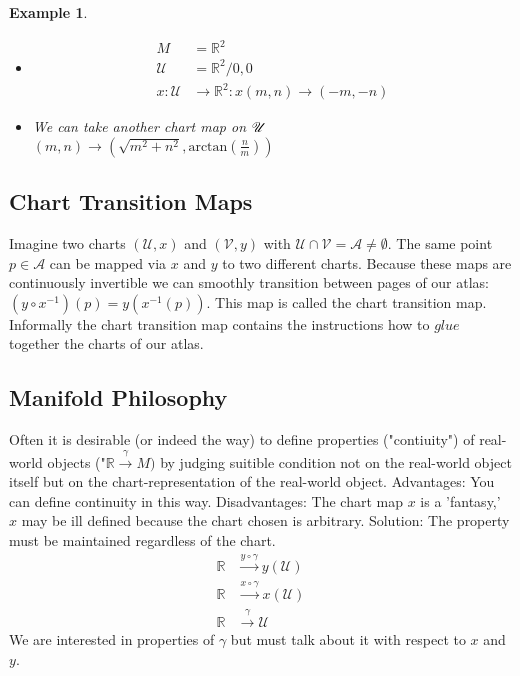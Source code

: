 \documentclass[10pt, oneside]{article}
\newcommand{\R}{\mathbb{R}}
\newtheorem{example}{Example}
\begin{document}
        \begin{example}
           \begin{itemize}
              \item \begin{align*}
                 M &= \R^2 \\
                 \mathcal{U} &= \R^2 \slash {0,0} \\
                 x: \mathcal{U} &\to \R^2 : x(m,n) \to (-m,-n)
              \end{align*}
              \item We can take another chart map on $\mathcal{U}\\$
           $(m,n) \to (\sqrt{m^2+n^2}, \text{arctan}(\frac{n}{m}))$
           \end{itemize}
        \end{example}
     \subsection{Chart Transition Maps}
        Imagine two charts $(\mathcal{U},x)$ and $(\mathcal{V},y)$ with $\mathcal{U} \cap \mathcal{V} = \mathcal{A} \neq \emptyset$. The same point $p \in \mathcal{A}$ can be mapped via $x$ and $y$ to two different charts.
        Because these maps are continuously invertible we can smoothly transition between pages of our atlas: $(y \circ x^{-1})(p) = y(x^{-1}(p))$.
        This map is called the chart transition map. Informally the chart transition map contains the instructions how to $glue$ together the charts of our atlas.
     \subsection{Manifold Philosophy}
        Often it is desirable (or indeed the way) to define properties ("contiuity") of real-world objects ("$\R \xrightarrow{\gamma} M)$ by judging suitible condition not on the real-world object itself but on the chart-representation of the real-world object.
        Advantages: You can define continuity in this way.
        Disadvantages: The chart map $x$ is a 'fantasy,' $x$ may be ill defined because the chart chosen is arbitrary.
        Solution: The property must be maintained regardless of the chart.
        \begin{align*}
        \R &\xrightarrow{y \circ \gamma} y(\mathcal{U}) \\
        \R &\xrightarrow{x \circ \gamma} x(\mathcal{U}) \\
        \R &\xrightarrow{\gamma} \mathcal{U}
        \end{align*}
        We are interested in properties of $\gamma$ but must talk about it with respect to $x$ and $y$.
\end{document}
